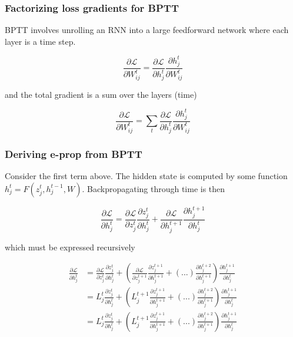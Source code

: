 \documentclass{beamer}
\begin{document}
\begin{frame}[plain]
\frametitle{Factorizing loss gradients for BPTT} 

BPTT involves unrolling an RNN into a large feedforward network where each layer is a time step. 

\begin{equation*}
\frac{\partial\mathcal{L}}{\partial W^{t}_{ij}} = \frac{\partial\mathcal{L}}{\partial h^{t}_{j}}  \frac{\partial h^{t}_{j}}{{\partial W^{t}_{ij}}} 
\end{equation*}

and the total gradient is a sum over the layers (time)

\begin{equation*}
\frac{\partial\mathcal{L}}{\partial W^{t}_{ij}} = \sum_{t} \frac{\partial\mathcal{L}}{\partial h^{t}_{j}}  \frac{\partial h^{t}_{j}}{{\partial W^{t}_{ij}}} 
\end{equation*}

\end{frame}

\begin{frame}[plain]
\frametitle{Deriving e-prop from BPTT} 

Consider the first term above. The hidden state is computed by some function $h_{j}^{t} = F(z_{j}^{t},h_{j}^{t-1} ,W)$. Backpropagating through time is then

\begin{equation*}
\frac{\partial\mathcal{L}}{\partial h^{t}_{j}} = \frac{\partial\mathcal{L}}{\partial z^{t}_{j}} \frac{\partial z^{t}_{j}}{\partial h^{t}_{j}}  + \frac{\partial\mathcal{L}}{\partial h^{t+1}_{j}} \frac{\partial h^{t+1}_{j}}{\partial h^{t}_{j}} 
\end{equation*}

which must be expressed recursively 

\begin{align*}
\frac{\partial\mathcal{L}}{\partial h^{t}_{j}} &= \frac{\partial\mathcal{L}}{\partial z^{t}_{j}} \frac{\partial z^{t}_{j}}{\partial h^{t}_{j}}  +  \left(\frac{\partial\mathcal{L}}{\partial z^{t+1}_{j}} \frac{\partial z^{t+1}_{j}}{\partial h^{t+1}_{j}}  + (...) \frac{\partial h^{t+2}_{j}}{\partial h^{t+1}_{j}} \right) \frac{\partial h^{t+1}_{j}}{\partial h^{t}_{j}} \\
&= L_{j}^{t} \frac{\partial z^{t}_{j}}{\partial h^{t}_{j}}  +  \left(L_{j}^{t+1} \frac{\partial z^{t+1}_{j}}{\partial h^{t+1}_{j}}  + (...) \frac{\partial h^{t+2}_{j}}{\partial h^{t+1}_{j}} \right) \frac{\partial h^{t+1}_{j}}{\partial h^{t}_{j}}\\
&= L_{j}^{t} \frac{\partial z^{t}_{j}}{\partial h^{t}_{j}}  +  \left(L_{j}^{t+1} \frac{\partial z^{t+1}_{j}}{\partial h^{t+1}_{j}}  + (...) \frac{\partial h^{t+2}_{j}}{\partial h^{t+1}_{j}} \right) \frac{\partial h^{t+1}_{j}}{\partial h^{t}_{j}}
\end{align*}

\end{frame}
\end{document}
